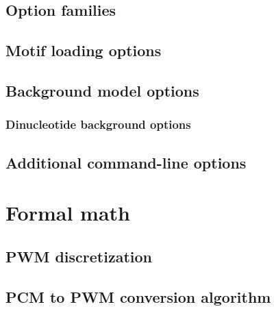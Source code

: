 \documentclass[]{article}
\begin{document}
  \subsection{Option families}\label{option-families}
  

  \subsection{Motif loading options}\label{motif-loading-options}
  

  \subsection{Background model options}\label{background-model-options}
  

  \subsubsection{Dinucleotide background options}\label{dinucleotide-background-options}
  

  \subsection{Additional command-line options}\label{advanced-options}
  


\section{Formal math}\label{formal-math}
  \subsection{PWM discretization}\label{discretization-strategy}
  

  \subsection{PCM to PWM conversion algorithm}\label{pcm2pwm-algorithm}
  


\end{document}
